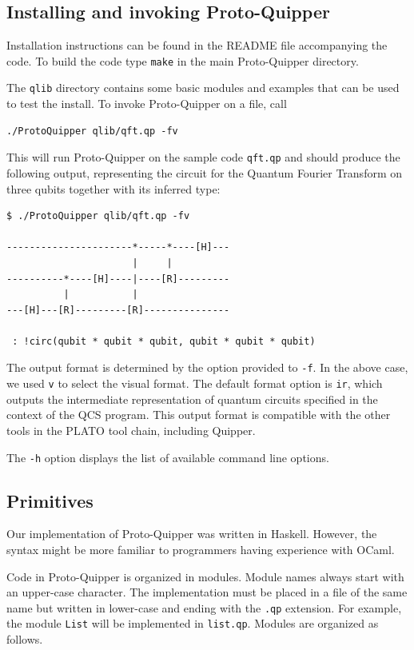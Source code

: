 \subsection{Installing and invoking Proto-Quipper}

Installation instructions can be found in the README file accompanying the code. 
To build the code type \verb#make# in the main Proto-Quipper directory. 

The \verb#qlib# directory contains some basic modules and examples that can 
be used to test the install. To invoke Proto-Quipper on a file, call 
\begin{verbatim}
./ProtoQuipper qlib/qft.qp -fv
\end{verbatim}
This will run Proto-Quipper on the sample code \verb#qft.qp# and should produce the following output, representing the circuit for the 
Quantum Fourier Transform on three qubits together with its inferred 
type:
\begin{verbatim}
$ ./ProtoQuipper qlib/qft.qp -fv

----------------------*-----*----[H]---
                      |     |          
----------*----[H]----|----[R]---------
          |           |                
---[H]---[R]---------[R]---------------

 : !circ(qubit * qubit * qubit, qubit * qubit * qubit)
\end{verbatim}
The output format is determined by the option provided to \verb#-f#. In the above case, we used \verb#v# to select the visual format. The default format option is \verb#ir#, which outputs the intermediate representation of quantum circuits specified in the context of the QCS program. This output format is compatible with the other tools in the PLATO tool chain, including Quipper.

The \verb#-h# option displays the list of available command line options. 

\subsection{Primitives}

Our implementation of Proto-Quipper was written in Haskell. However, the 
syntax might be more familiar to programmers having experience with OCaml.

Code in Proto-Quipper is organized in modules. Module names always start 
with an upper-case character. The implementation must be placed in a file 
of the same name but written in lower-case and ending with the {\tt.qp} 
extension. For example, the module {\tt List} will be implemented in 
{\tt list.qp}. Modules are organized as follows.

